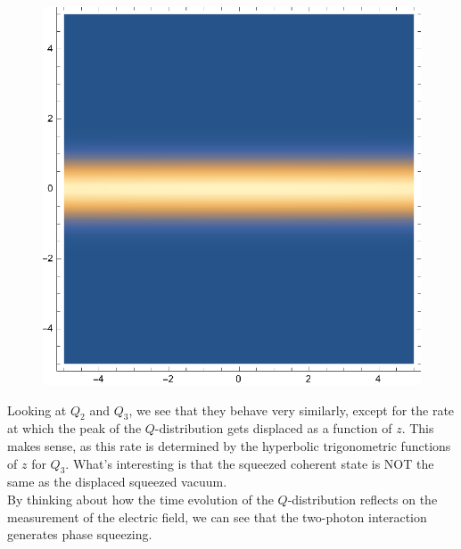 \documentclass{article}
\theoremstyle{definition}
\begin{document}
\begin{enumerate}[label=(\alph*)]
\begin{itemize}
\begin{figure}[!htb]
	\begin{minipage}{.3\textwidth}
  	\centering
  	\includegraphics[width=.55\linewidth]{figures/Q3-z-40.eps}
	\end{minipage}
\end{figure} 

\end{itemize}


Looking at $Q_2$ and $Q_3$, we see that they behave very similarly, except for the rate at which the peak of the $Q$-distribution gets displaced as a function of $z$. This makes sense, as this rate is determined by the hyperbolic trigonometric functions of $z$ for $Q_3$. What's interesting is that the squeezed coherent state is NOT the same as the displaced squeezed vacuum. \\

By thinking about how the time evolution of the $Q$-distribution reflects on the measurement of the electric field, we can see that the two-photon interaction generates phase squeezing. 


\end{enumerate}
\end{document}
